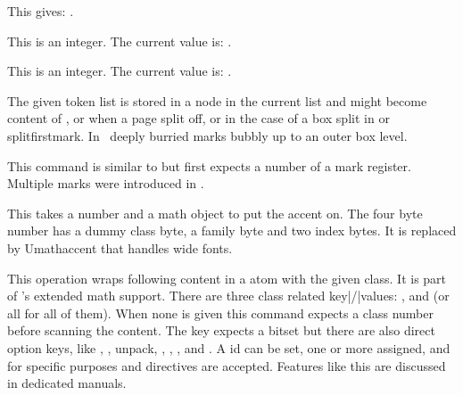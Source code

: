 \stopnewprimitive

\startnewprimitive[title={\prm {luatexbanner}}]

This gives: {\tttf \luatexbanner}.

\stopnewprimitive

\startnewprimitive[title={\prm {luatexrevision}}]

This is an integer. The current value is: {\tttf \number\luatexrevision}.

\stopnewprimitive

\startnewprimitive[title={\prm {luatexversion}}]

This is an integer. The current value is: {\tttf \number\luatexversion}.

\stopnewprimitive

\startoldprimitive[title={\prm {mark}}][obsolete=yes]

The given token list is stored in a node in the current list and might become
content of ,  or  when a page split
off, or in the case of a box split in  or \prm
{splitfirstmark}. In \LUAMETATEX\ deeply burried marks bubbly up to an outer box
level.

\stopoldprimitive

\startoldprimitive[title={\prm {marks}}]

This command is similar to  but first expects a number of a mark
register. Multiple marks were introduced in \ETEX.

\stopoldprimitive

\startoldprimitive[title={\prm {mathaccent}}][obsolete=yes]

This takes a number and a math object to put the accent on. The four byte number
has a dummy class byte, a family byte and two index bytes. It is replaced by \prm
{Umathaccent} that handles wide fonts.

\stopoldprimitive

\startnewprimitive[title={\prm {mathatom}}]

This operation wraps following content in a atom with the given class. It is part
of \LUAMETATEX's extended math support. There are three class related
key|/|values: ,  and  (or \type
{all} for all of them). When none is given this command expects a class number
before scanning the content. The  key expects a bitset but there
are also direct option keys, like , , \type
{unpack}, , , ,  and
. A  id can be set, one or more 
assigned, and for specific purposes  and 
directives are accepted. Features like this are discussed in dedicated manuals.

